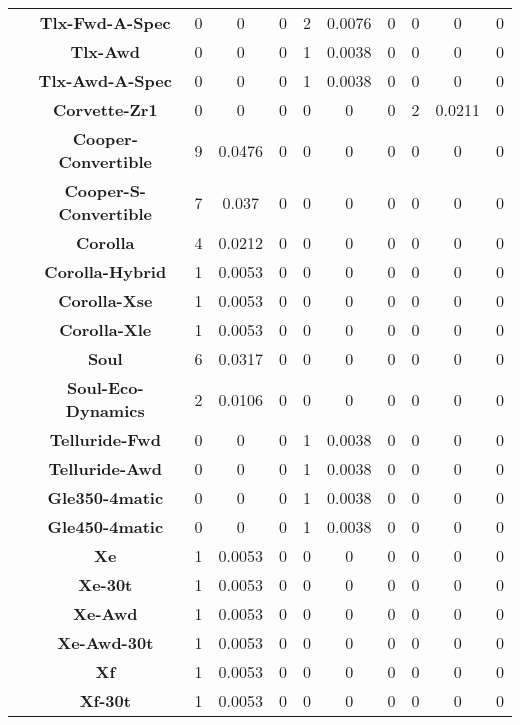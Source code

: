 \begin{center}
\begin{tabular}{|c|c||@{\hspace{1ex}}||c|c|c||@{\hspace{1ex}}||c|c|c||@{\hspace{1ex}}||c|c|c||@{\hspace{1ex}}||}
\cline{2-11}
  & {\bf Tlx-Fwd-A-Spec} & 0 & 0 & 0 & 2 & 0.0076 & 0 & 0 & 0 & 0 \\
\cline{2-11}
  & {\bf Tlx-Awd} & 0 & 0 & 0 & 1 & 0.0038 & 0 & 0 & 0 & 0 \\
\cline{2-11}
  & {\bf Tlx-Awd-A-Spec} & 0 & 0 & 0 & 1 & 0.0038 & 0 & 0 & 0 & 0 \\
\cline{2-11}
  & {\bf Corvette-Zr1} & 0 & 0 & 0 & 0 & 0 & 0 & 2 & 0.0211 & 0 \\
\cline{2-11}
  & {\bf Cooper-Convertible} & 9 & 0.0476 & 0 & 0 & 0 & 0 & 0 & 0 & 0 \\
\cline{2-11}
  & {\bf Cooper-S-Convertible} & 7 & 0.037 & 0 & 0 & 0 & 0 & 0 & 0 & 0 \\
\cline{2-11}
  & {\bf Corolla} & 4 & 0.0212 & 0 & 0 & 0 & 0 & 0 & 0 & 0 \\
\cline{2-11}
  & {\bf Corolla-Hybrid} & 1 & 0.0053 & 0 & 0 & 0 & 0 & 0 & 0 & 0 \\
\cline{2-11}
  & {\bf Corolla-Xse} & 1 & 0.0053 & 0 & 0 & 0 & 0 & 0 & 0 & 0 \\
\cline{2-11}
  & {\bf Corolla-Xle} & 1 & 0.0053 & 0 & 0 & 0 & 0 & 0 & 0 & 0 \\
\cline{2-11}
  & {\bf Soul} & 6 & 0.0317 & 0 & 0 & 0 & 0 & 0 & 0 & 0 \\
\cline{2-11}
  & {\bf Soul-Eco-Dynamics} & 2 & 0.0106 & 0 & 0 & 0 & 0 & 0 & 0 & 0 \\
\cline{2-11}
  & {\bf Telluride-Fwd} & 0 & 0 & 0 & 1 & 0.0038 & 0 & 0 & 0 & 0 \\
\cline{2-11}
  & {\bf Telluride-Awd} & 0 & 0 & 0 & 1 & 0.0038 & 0 & 0 & 0 & 0 \\
\cline{2-11}
  & {\bf Gle350-4matic} & 0 & 0 & 0 & 1 & 0.0038 & 0 & 0 & 0 & 0 \\
\cline{2-11}
  & {\bf Gle450-4matic} & 0 & 0 & 0 & 1 & 0.0038 & 0 & 0 & 0 & 0 \\
\cline{2-11}
  & {\bf Xe} & 1 & 0.0053 & 0 & 0 & 0 & 0 & 0 & 0 & 0 \\
\cline{2-11}
  & {\bf Xe-30t} & 1 & 0.0053 & 0 & 0 & 0 & 0 & 0 & 0 & 0 \\
\cline{2-11}
  & {\bf Xe-Awd} & 1 & 0.0053 & 0 & 0 & 0 & 0 & 0 & 0 & 0 \\
\cline{2-11}
  & {\bf Xe-Awd-30t} & 1 & 0.0053 & 0 & 0 & 0 & 0 & 0 & 0 & 0 \\
\cline{2-11}
  & {\bf Xf} & 1 & 0.0053 & 0 & 0 & 0 & 0 & 0 & 0 & 0 \\
\cline{2-11}
  & {\bf Xf-30t} & 1 & 0.0053 & 0 & 0 & 0 & 0 & 0 & 0 & 0 \\

\end{tabular}
\end{center}
